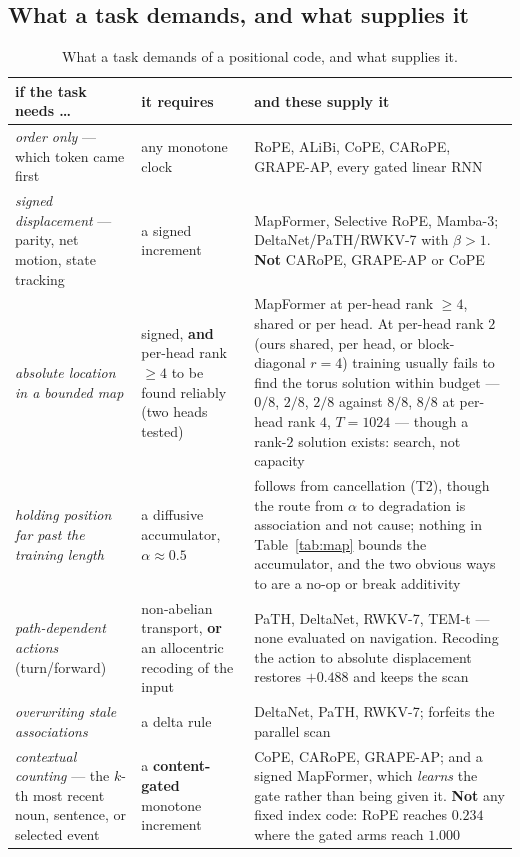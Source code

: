 \documentclass[11pt]{article}
\begin{document}
\subsection{What a task demands, and what supplies it}

\begin{table}[htbp]\centering\small
\caption{What a task demands of a positional code, and what supplies it.}
\label{tab:capability}
\begin{tabular}{@{}p{4.0cm}p{3.4cm}p{6.6cm}@{}}
\toprule
if the task needs \dots & it requires & and these supply it \\
\midrule
\emph{order only} --- which token came first & any monotone clock & RoPE, ALiBi, CoPE, CARoPE, GRAPE-AP, every gated linear RNN \\[3pt]
\emph{signed displacement} --- parity, net motion, state tracking & a signed increment & MapFormer, Selective RoPE, Mamba-3; DeltaNet/PaTH/RWKV-7 with $\beta>1$. \textbf{Not} CARoPE, GRAPE-AP or CoPE \\[3pt]
\emph{absolute location in a bounded map} & signed, \textbf{and} per-head rank $\ge4$ to be found reliably (two heads tested) & MapFormer at per-head rank $\ge4$, shared or per head. At per-head rank $2$ (ours shared, per head, or block-diagonal $r=4$) training usually fails to find the torus solution within budget --- $0/8$, $2/8$, $2/8$ against $8/8$, $8/8$ at per-head rank $4$, $T{=}1024$ --- though a rank-$2$ solution exists: search, not capacity \\[3pt]
\emph{holding position far past the training length} & a diffusive accumulator, $\alpha\approx0.5$ & follows from cancellation (T2), though the route from $\alpha$ to degradation is association and not cause; nothing in Table~\ref{tab:map} bounds the accumulator, and the two obvious ways to are a no-op or break additivity \\[3pt]
\emph{path-dependent actions} (turn/forward) & non-abelian transport, \textbf{or} an allocentric recoding of the input & PaTH, DeltaNet, RWKV-7, TEM-t --- none evaluated on navigation. Recoding the action to absolute displacement restores $+0.488$ and keeps the scan \\[3pt]
\emph{overwriting stale associations} & a delta rule & DeltaNet, PaTH, RWKV-7; forfeits the parallel scan \\[3pt]
\emph{contextual counting} --- the $k$-th most recent noun, sentence, or selected event & a \textbf{content-gated} monotone increment & CoPE, CARoPE, GRAPE-AP; and a signed MapFormer, which \emph{learns} the gate rather than being given it. \textbf{Not} any fixed index code: RoPE reaches $0.234$ where the gated arms reach $1.000$ \\[3pt]

\end{tabular}
\end{table}
\end{document}
